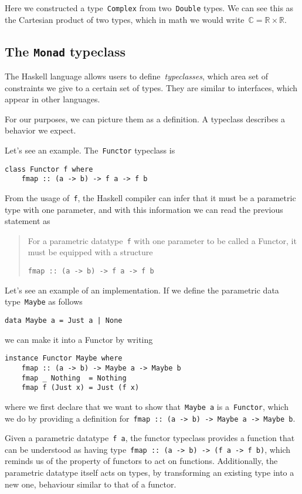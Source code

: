 \documentclass[a4paper]{article}
\theoremstyle{plain}
\theoremstyle{definition}
\begin{document}
Here we constructed a type~\texttt{Complex} from
two~\texttt{Double} types. We can see this as the Cartesian product
of two types, which in math we would
write~\(\mathbb{C}=\mathbb{R}\times\mathbb{R}\).

\subsection{The \texorpdfstring{\texttt{Monad}}{Monad} typeclass}
The Haskell language allows users to define~\emph{typeclasses}, which area set
of constraints we give to a certain set of types.
They are similar to interfaces, which appear in other languages.

For our purposes, we can picture them as a definition. A typeclass describes a
behavior we expect.

Let's see an example. The~\texttt{Functor} typeclass is
\begin{verbatim}
class Functor f where
    fmap :: (a -> b) -> f a -> f b
\end{verbatim}
From the usage of~\texttt{f}, the Haskell compiler can infer
that it must be a parametric type with one parameter, and
with this information we can read the previous statement as
\begin{quote}
    For a parametric datatype~\texttt{f} with one parameter to be
    called a Functor, it must be equipped with a structure

    \texttt{fmap :: (a -> b) -> f a -> f b}
\end{quote}

Let's see an example of an implementation. If we define the parametric data
type~\texttt{Maybe} as follows
\begin{verbatim}
data Maybe a = Just a | None
\end{verbatim}
we can make it into a Functor by writing
\begin{verbatim}
instance Functor Maybe where
    fmap :: (a -> b) -> Maybe a -> Maybe b
    fmap _ Nothing  = Nothing
    fmap f (Just x) = Just (f x)
\end{verbatim}
where we first declare that we want to show that~\texttt{Maybe a}
is a~\texttt{Functor}, which we do by providing a definition
for~\texttt{fmap :: (a -> b) -> Maybe a -> Maybe b}.

Given a parametric datatype~\texttt{f a}, the functor typeclass
provides a function that can be understood as having
type~\texttt{fmap :: (a -> b) -> (f a -> f b)}, which reminds us of
the property of functors to act on functions. Additionally, the parametric
datatype itself acts on types, by transforming an existing type into a new one,
behaviour similar to that of a functor.
\end{document}
